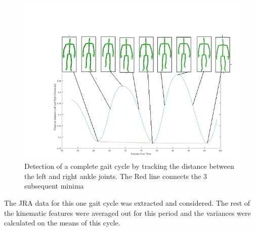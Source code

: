 \begin{figure}[h]
\centering
\includegraphics[scale=0.8]{wave.png}
\caption{Detection of a complete gait cycle by tracking the distance between the left and right ankle joints.
The Red line connects the 3 subsequent minima
}
\end{figure}

\noindent The JRA data for this one gait cycle was extracted and considered. The rest of the kinematic features were averaged out for this period and the variances were calculated on the means of this cycle.








